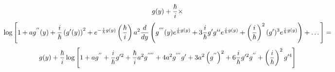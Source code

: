           $$
g(y)+{\hbar\over i}\times
        $$
         $$
      \log \left[
1+ 
      ag^{''}(y)+
       {i\over \hbar}
       \left(g'(y)\right)^2
              +
e^{-{i\over \hbar}g(y)}
  \left(\hbar\over i\right)
         a^2
       {d\over dy}
         \left(
             g^{'''}(y)
          e^{{i\over \hbar}g(y)}
              +
                3
       {i\over \hbar}
                g'g^{ii}
          e^{{i\over \hbar}g(y)}
              +
       \left(i\over \hbar\right)^2
                  (g')^3
          e^{{i\over \hbar}g(y)}   \right)
        +
\dots   \right]=  
       $$ 
       $$
     g(y)+{\hbar\over i}
    \log \left[
      1+ag^{''}
          +{i\over \hbar}g'^2
          +{\hbar\over i}a^2g^{''''}
         +4a^2g^{'''}g'+3a^2
       \left(g^{''} \right)^2      
     +6{i\over \hbar}g'^2g^{''}+
     \left(
   {i\over \hbar}
    \right)^2 
      g'^4      
\right]
      $$

\bye 

